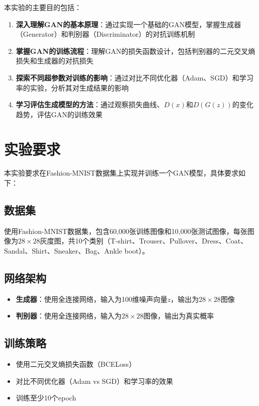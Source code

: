 \documentclass[a4paper]{article}
\begin{document}
本实验的主要目的包括：

\begin{enumerate}
    \item \textbf{深入理解GAN的基本原理}：通过实现一个基础的GAN模型，掌握生成器（Generator）和判别器（Discriminator）的对抗训练机制
    \item \textbf{掌握GAN的训练流程}：理解GAN的损失函数设计，包括判别器的二元交叉熵损失和生成器的对抗损失
    \item \textbf{探索不同超参数对训练的影响}：通过对比不同优化器（Adam、SGD）和学习率的实验，分析其对生成结果的影响
    \item \textbf{学习评估生成模型的方法}：通过观察损失曲线、$D(x)$和$D(G(z))$的变化趋势，评估GAN的训练效果
\end{enumerate}

\section{实验要求}

本实验要求在Fashion-MNIST数据集上实现并训练一个GAN模型，具体要求如下：

\subsection{数据集}
使用Fashion-MNIST数据集，包含60,000张训练图像和10,000张测试图像，每张图像为$28 \times 28$灰度图，共10个类别（T-shirt、Trouser、Pullover、Dress、Coat、Sandal、Shirt、Sneaker、Bag、Ankle boot）。

\subsection{网络架构}
\begin{itemize}
    \item \textbf{生成器}：使用全连接网络，输入为100维噪声向量$z$，输出为$28 \times 28$图像
    \item \textbf{判别器}：使用全连接网络，输入为$28 \times 28$图像，输出为真实概率
\end{itemize}

\subsection{训练策略}
\begin{itemize}
    \item 使用二元交叉熵损失函数（BCELoss）
    \item 对比不同优化器（Adam vs SGD）和学习率的效果
    \item 训练至少10个epoch
\end{itemize}
\end{document}
